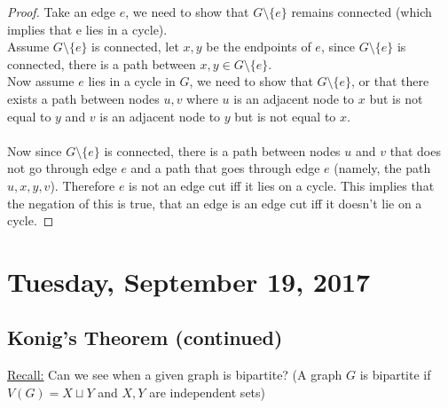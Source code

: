 \documentclass[12pt]{article}
\begin{document}
\begin{proof}
	Take an edge $e$, we need to show that $G\setminus \{ e \}$ remains connected (which implies that e lies in a cycle).\\
	Assume $G \setminus \{ e \}$ is connected, let $x,y$ be the endpoints of $e$, since $G \setminus \{ e \}$ is connected, there is a path between $x,y \in G \setminus \{ e \}$.\\
	Now assume $e$ lies in a cycle in $G$, we need to show that $G \setminus \{ e \}$, or that there exists a path between nodes $u,v$ where $u$ is an adjacent node to $x$ but is not equal to $y$ and $v$ is an adjacent node to $y$ but is not equal to $x$.\\
	\\
	Now since $G \setminus \{ e \}$ is connected, there is a path between nodes $u$ and $v$ that does not go through edge $e$ and a path that goes through edge $e$ (namely, the path $u,x,y,v$). Therefore $e$ is not an edge cut iff it lies on a cycle. This implies that the negation of this is true, that an edge is an edge cut iff it doesn't lie on a cycle.
\end{proof}

\newpage

\section{Tuesday, September 19, 2017}

\subsection{Konig's Theorem (continued)}

\begin{tcolorbox}
	\underline{Recall:} Can we see when a given graph is bipartite? (A graph $G$ is bipartite if $V(G) = X \sqcup Y$ and $X,Y$ are independent sets)
\end{tcolorbox}
\end{document}

